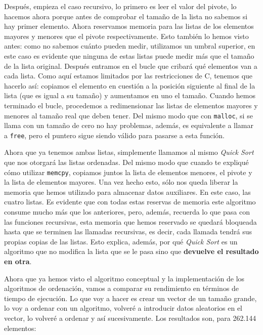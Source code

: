 \documentclass[a4paper]{article}
\begin{document}
Después, empieza el caso recursivo, lo primero es leer el valor del pivote,
lo hacemos ahora porque antes de comprobar el tamaño de la lista no sabemos
si hay primer elemento. Ahora reservamos memoria para las listas de los
elementos mayores y menores que el pivote respectivamente. Esto también lo hemos
visto antes: como no sabemos cuánto pueden medir, utilizamos un umbral superior,
en este caso es evidente que ninguna de estas listas puede medir más que el
tamaño de la lista original. Después entramos en el bucle que cribará qué
elementos van a cada lista. Como aquí estamos limitados por las restricciones de
C, tenemos que hacerlo así: copiamos el elemento en cuestión a la posición
siguiente al final de la lista (que es igual a su tamaño) y aumentamos
en uno el tamaño. Cuando hemos terminado el bucle, procedemos a redimensionar
las listas de elementos mayores y menores al tamaño real que deben tener. Del
mismo modo que con \verb!malloc!, si se llama con un tamaño de cero no hay
problemas, además, es equivalente a llamar a \verb!free!, pero el puntero
sigue siendo válido para pasarse a esta función.

Ahora que ya tenemos ambas listas, simplemente llamamos al mismo \textit{Quick
Sort} que nos otorgará las listas ordenadas. Del mismo modo que cuando
te expliqué cómo utilizar \verb!memcpy!, copiamos juntos la lista de elementos
menores, el pivote y la lista de elementos mayores. Una vez hecho esto, sólo
nos queda liberar la memoria que hemos utilizado para almacenar datos
auxiliares. En este caso, las cuatro listas. Es evidente que con todas estas
reservas de memoria este algoritmo consume mucho más que los anteriores, pero,
además, recuerda lo que pasa con las funciones recursivas, esta memoria que
hemos reservado se quedará bloqueada hasta que se terminen las llamadas
recursivas, es decir, cada llamada tendrá sus propias copias de las listas.
Esto explica, además, por qué \textit{Quick Sort} es un algoritmo que
no modifica la lista que se le pasa sino que
\textbf{devuelve el resultado en otra}.

Ahora que ya hemos visto el algoritmo conceptual y la implementación de los
algoritmos de ordenación, vamos a comparar su rendimiento en términos de tiempo
de ejecución. Lo que voy a hacer es crear un vector de un tamaño grande, lo voy
a ordenar con un algoritmo, volveré a introducir datos aleatorios en el vector,
lo volveré a ordenar y así sucesivamente. Los resultados son, para 262.144
elementos:
\end{document}
